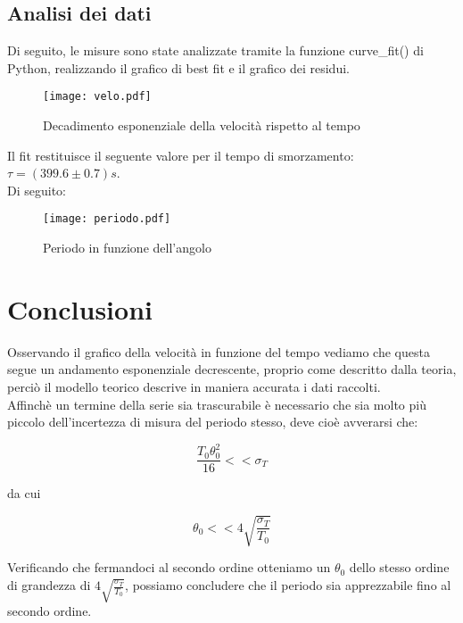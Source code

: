 \documentclass{article}
\begin{document}
\vspace{1em}

\subsection{Analisi dei dati}
Di seguito, le misure sono state analizzate tramite la funzione curve\_fit() di Python, realizzando il grafico di best fit e il grafico dei residui. 

\begin{figure}[H]
    \centering
    \texttt{[image: velo.pdf]}
    \caption{Decadimento esponenziale della velocità rispetto al tempo}
    \label{fig:my_label}
\end{figure}

Il fit restituisce il seguente valore per il tempo di smorzamento: $\tau = (399.6 \pm 0.7)s$.\\
Di seguito:

\begin{figure} [H]
    \centering
    \texttt{[image: periodo.pdf]}
    \caption[width=15cm]{Periodo in funzione dell'angolo}
    \label{fig:my_label}
\end{figure} 

\section{Conclusioni}
Osservando il grafico della velocità in funzione del tempo vediamo che questa
segue un andamento esponenziale decrescente, proprio come descritto dalla teoria, perciò il modello teorico descrive in maniera accurata i dati raccolti.\\
Affinchè un termine della serie sia trascurabile è necessario che sia molto più piccolo dell'incertezza di misura del periodo stesso, deve cioè avverarsi che:

\begin{equation}
    \frac{T_0 \theta_0 ^2}{16} << \sigma_T
\end{equation}

da cui

\begin{equation}
    \theta_0 << 4\sqrt{\frac{\sigma_T}{T_0}}
\end{equation}

Verificando che fermandoci al secondo ordine otteniamo un $\theta_0$ dello stesso ordine di grandezza di $4\sqrt{\frac{\sigma_T}{T_0}}$, possiamo concludere che il periodo sia apprezzabile fino al secondo ordine.
\end{document}
